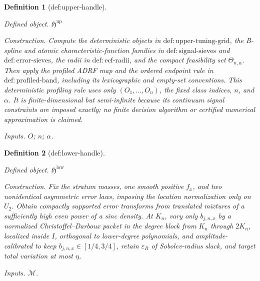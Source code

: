 \documentclass{article}
\newtheorem{definition}{Definition}
\begin{document}
\begin{definition}[def:upper-handle]\label{def:upper-handle}
\par\smallskip\noindent\emph{Defined object.} \(\mathfrak H^{\mathrm{up}}\)
\par\smallskip\noindent\emph{Construction.} Compute the deterministic objects in \(\mathrm{def{:}upper\text{-}tuning\text{-}grid}\), the B-spline and atomic characteristic-function families in \(\mathrm{def{:}signal\text{-}sieves}\) and \(\mathrm{def{:}error\text{-}sieves}\), the radii in \(\mathrm{def{:}ecf\text{-}radii}\), and the compact feasibility set \(\Theta_{n,\alpha}\). Then apply the profiled ADRF map and the ordered endpoint rule in \(\mathrm{def{:}profiled\text{-}band}\), including its lexicographic and empty-set conventions. This deterministic profiling rule uses only \((O_1,\ldots,O_n)\), the fixed class indices, \(n\), and \(\alpha\). It is finite-dimensional but semi-infinite because its continuum signal constraints are imposed exactly; no finite decision algorithm or certified numerical approximation is claimed.
\par\smallskip\noindent\emph{Inputs.} \(O\); \(n\); \(\alpha\).
\end{definition}

\begin{definition}[def:lower-handle]\label{def:lower-handle}
\par\smallskip\noindent\emph{Defined object.} \(\mathfrak H^{\mathrm{low}}\)
\par\smallskip\noindent\emph{Construction.} Fix the stratum masses, one smooth positive \(f_x\), and two nonidentical asymmetric error laws, imposing the location normalization only on \(U_2\). Obtain compactly supported error transforms from translated mixtures of a sufficiently high even power of a sinc density. At \(K_n\), vary only \(b_{j,n,x}\) by a normalized Christoffel--Darboux packet in the degree block from \(K_n\) through \(2K_n\), localized inside \(I\), orthogonal to lower-degree polynomials, and amplitude-calibrated to keep \(b_{j,n,x}\in[1/4,3/4]\), retain \(\varepsilon_R\) of Sobolev-radius slack, and target total variation at most \(\eta\).
\par\smallskip\noindent\emph{Inputs.} \(\mathcal M\).
\end{definition}
\end{document}
